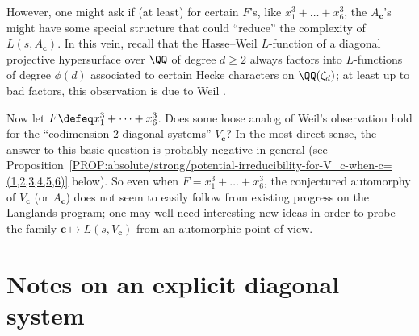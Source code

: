 \documentclass[12pt]{report}
\begin{document}
However,
one might ask if (at least) for certain $F$'s,
like $x_1^3+\dots+x_6^3$,
the $A_{\bm{c}}$'s might have some special structure that could ``reduce'' the complexity of $L(s,A_{\bm{c}})$.
In this vein,
recall that the Hasse--Weil $L$-function of a diagonal projective hypersurface over $\QQ$ of degree $d\geq2$ always factors into $L$-functions of degree $\phi(d)$ associated to certain Hecke characters on $\QQ(\zeta_d)$;
at least up to bad factors,
this observation is due to Weil \cite{weil1952jacobi}.

Now let $F\defeq x_1^3+\dots+x_6^3$.
Does some loose analog of Weil's observation hold for the ``codimension-$2$ diagonal systems'' $V_{\bm{c}}$?
In the most direct sense,
the answer to this basic question is probably negative in general
(see Proposition~\ref{PROP:absolute/strong/potential-irreducibility-for-V_c-when-c=(1,2,3,4,5,6)} below).
So even when $F=x_1^3+\dots+x_6^3$,
the conjectured automorphy of $V_{\bm{c}}$ (or $A_{\bm{c}}$) does not seem to easily follow from existing progress on the Langlands program;
one may well need interesting new ideas in order to
probe the family $\bm{c}\mapsto L(s,V_{\bm{c}})$ from an automorphic point of view.

\section{Notes on an explicit diagonal system}


\end{document}
